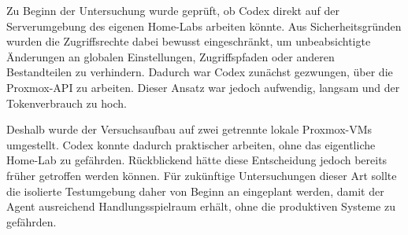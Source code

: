 Zu Beginn der Untersuchung wurde geprüft, ob Codex direkt auf der Serverumgebung des eigenen Home-Labs arbeiten könnte. Aus Sicherheitsgründen wurden die Zugriffsrechte dabei bewusst eingeschränkt, um unbeabsichtigte Änderungen an globalen Einstellungen, Zugriffspfaden oder anderen Bestandteilen zu verhindern. Dadurch war Codex zunächst gezwungen, über die Proxmox-\acs{API} zu arbeiten. Dieser Ansatz war jedoch aufwendig, langsam und der Tokenverbrauch zu hoch. 

Deshalb wurde der Versuchsaufbau auf zwei getrennte lokale Proxmox-\acp{VM} umgestellt. Codex konnte dadurch praktischer arbeiten, ohne das eigentliche Home-Lab zu gefährden. Rückblickend hätte diese Entscheidung jedoch bereits früher getroffen werden können. Für zukünftige Untersuchungen dieser Art sollte die isolierte Testumgebung daher von Beginn an eingeplant werden, damit der Agent ausreichend Handlungsspielraum erhält, ohne die produktiven Systeme zu gefährden.\cite{openai2026codexsandbox}